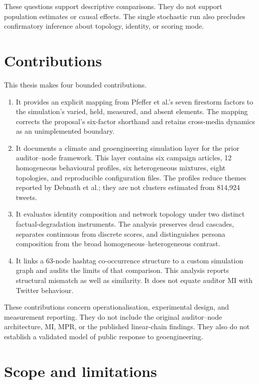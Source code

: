 These questions support descriptive comparisons.
They do not support population estimates or causal effects.
The single stochastic run also precludes confirmatory inference about topology, identity, or scoring mode.

\section{Contributions}
\label{sec:introduction_contributions}

This thesis makes four bounded contributions.

\begin{enumerate}
    \item It provides an explicit mapping from Pfeffer et al.'s seven firestorm factors to the simulation's varied, held, measured, and absent elements.
    The mapping corrects the proposal's six-factor shorthand and retains cross-media dynamics as an unimplemented boundary.

    \item It documents a climate and geoengineering simulation layer for the prior auditor--node framework.
    This layer contains six campaign articles, 12 homogeneous behavioural profiles, six heterogeneous mixtures, eight topologies, and reproducible configuration files.
    The profiles reduce themes reported by Debnath et al.; they are not clusters estimated from 814,924 tweets.

    \item It evaluates identity composition and network topology under two distinct factual-degradation instruments.
    The analysis preserves dead cascades, separates continuous from discrete scores, and distinguishes persona composition from the broad homogeneous--heterogeneous contrast.

    \item It links a 63-node hashtag co-occurrence structure to a custom simulation graph and audits the limits of that comparison.
    This analysis reports structural mismatch as well as similarity.
    It does not equate auditor MI with Twitter behaviour.
\end{enumerate}

These contributions concern operationalisation, experimental design, and measurement reporting.
They do not include the original auditor--node architecture, MI, MPR, or the published linear-chain findings.
They also do not establish a validated model of public response to geoengineering.

\section{Scope and limitations}
\label{sec:introduction_scope}

